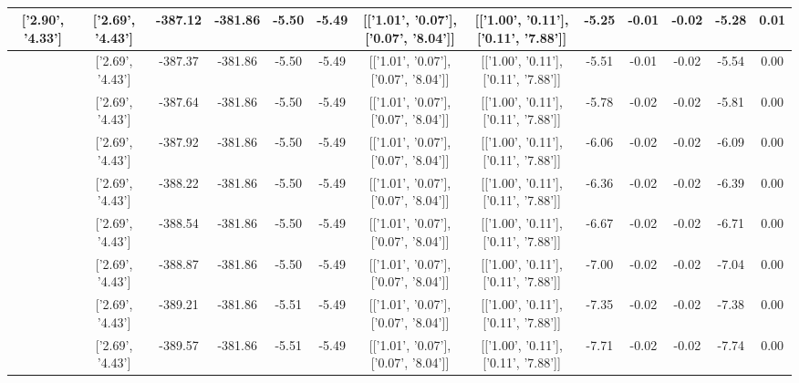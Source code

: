 \begin{table}[htbp]
\begin{adjustbox}{angle=90}
\begin{tabular}{|c|c|c|c|c|c|c|c|c|c|c|c|c|}
 ['2.90', '4.33'] & ['2.69', '4.43'] & -387.12 & -381.86 & -5.50 & -5.49 & [['1.01', '0.07'], ['0.07', '8.04']] & [['1.00', '0.11'], ['0.11', '7.88']] & -5.25 & -0.01 & -0.02 & -5.28 & 0.01\\ \hline
 ['2.91', '4.32'] & ['2.69', '4.43'] & -387.37 & -381.86 & -5.50 & -5.49 & [['1.01', '0.07'], ['0.07', '8.04']] & [['1.00', '0.11'], ['0.11', '7.88']] & -5.51 & -0.01 & -0.02 & -5.54 & 0.00\\ \hline
 ['2.93', '4.32'] & ['2.69', '4.43'] & -387.64 & -381.86 & -5.50 & -5.49 & [['1.01', '0.07'], ['0.07', '8.04']] & [['1.00', '0.11'], ['0.11', '7.88']] & -5.78 & -0.02 & -0.02 & -5.81 & 0.00\\ \hline
 ['2.94', '4.31'] & ['2.69', '4.43'] & -387.92 & -381.86 & -5.50 & -5.49 & [['1.01', '0.07'], ['0.07', '8.04']] & [['1.00', '0.11'], ['0.11', '7.88']] & -6.06 & -0.02 & -0.02 & -6.09 & 0.00\\ \hline
 ['2.95', '4.31'] & ['2.69', '4.43'] & -388.22 & -381.86 & -5.50 & -5.49 & [['1.01', '0.07'], ['0.07', '8.04']] & [['1.00', '0.11'], ['0.11', '7.88']] & -6.36 & -0.02 & -0.02 & -6.39 & 0.00\\ \hline
 ['2.96', '4.30'] & ['2.69', '4.43'] & -388.54 & -381.86 & -5.50 & -5.49 & [['1.01', '0.07'], ['0.07', '8.04']] & [['1.00', '0.11'], ['0.11', '7.88']] & -6.67 & -0.02 & -0.02 & -6.71 & 0.00\\ \hline
 ['2.98', '4.29'] & ['2.69', '4.43'] & -388.87 & -381.86 & -5.50 & -5.49 & [['1.01', '0.07'], ['0.07', '8.04']] & [['1.00', '0.11'], ['0.11', '7.88']] & -7.00 & -0.02 & -0.02 & -7.04 & 0.00\\ \hline
 ['2.99', '4.29'] & ['2.69', '4.43'] & -389.21 & -381.86 & -5.51 & -5.49 & [['1.01', '0.07'], ['0.07', '8.04']] & [['1.00', '0.11'], ['0.11', '7.88']] & -7.35 & -0.02 & -0.02 & -7.38 & 0.00\\ \hline
 ['3.00', '4.28'] & ['2.69', '4.43'] & -389.57 & -381.86 & -5.51 & -5.49 & [['1.01', '0.07'], ['0.07', '8.04']] & [['1.00', '0.11'], ['0.11', '7.88']] & -7.71 & -0.02 & -0.02 & -7.74 & 0.00\\ \hline
            \end{tabular}
        \end{adjustbox}
        \caption{}
        \label{}
    \end{table}
    